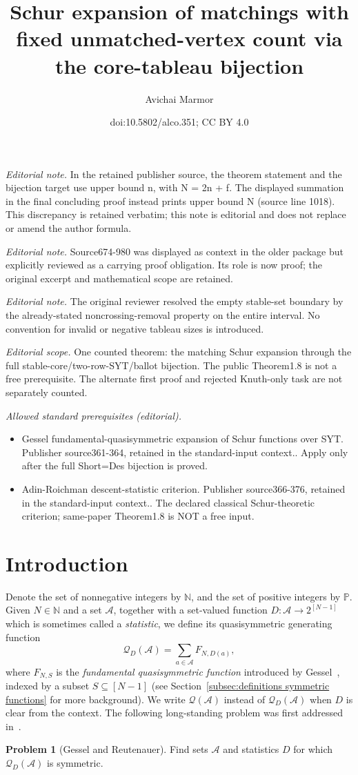 \documentclass[11pt]{article}
\title{Schur expansion of matchings with fixed unmatched-vertex count via the core-tableau bijection}
\author{Avichai Marmor}
\date{doi:10.5802/alco.351; CC BY 4.0}
\theoremstyle{definition}
\numberwithin{equation}{section}
\newtheorem{problem}[theo]{Problem}
\newcommand{\NN}{\mathbb{N}}
\newcommand{\PP}{\mathbb{P}}
\newcommand{\Q}{\mathcal{Q}}
\newcommand{\A}{\mathcal{A}}
\begin{document}
\maketitle
\noindent\textit{Editorial note.} In the retained publisher source, the theorem statement and the bijection target use upper bound n, with N = 2n + f. The displayed summation in the final concluding proof instead prints upper bound N (source line 1018). This discrepancy is retained verbatim; this note is editorial and does not replace or amend the author formula.\par\medskip
\noindent\textit{Editorial note.} Source674-980 was displayed as context in the older package but explicitly reviewed as a carrying proof obligation. Its role is now proof; the original excerpt and mathematical scope are retained.\par\medskip
\noindent\textit{Editorial note.} The original reviewer resolved the empty stable-set boundary by the already-stated noncrossing-removal property on the entire interval. No convention for invalid or negative tableau sizes is introduced.\par\medskip
\noindent\textit{Editorial scope.} One counted theorem: the matching Schur expansion through the full stable-core/two-row-SYT/ballot bijection. The public Theorem1.8 is not a free prerequisite. The alternate first proof and rejected Knuth-only task are not separately counted.\par\medskip
\noindent\textit{Allowed standard prerequisites (editorial).}\begin{itemize}
\item Gessel fundamental-quasisymmetric expansion of Schur functions over SYT. Publisher source361-364, retained in the standard-input context.. Apply only after the full Short=Des bijection is proved.
\item Adin-Roichman descent-statistic criterion. Publisher source366-376, retained in the standard-input context.. The declared classical Schur-theoretic criterion; same-paper Theorem1.8 is NOT a free input.
\end{itemize}\medskip
\section{Introduction}
\label{sec:introduction}

Denote the set of nonnegative integers by $\NN$, and the set of positive integers by $\PP$. Given $N\in \NN$ and a set $\A$, together with a set-valued function $D:\A\to 2^{[N-1]}$ which is sometimes called a \emph{statistic}, we define its quasisymmetric generating function
\[
    \Q_{D} (\A) = \sum_{a \in \A} F_{N, D(a)},
\]
where $F_{N, S}$ is the \emph{fundamental quasisymmetric function} introduced by Gessel~\cite{knuth_classes_schur_positive}, indexed by a subset $S \subseteq [N-1]$ (see Section~\ref{subsec:definitions symmetric functions} for more background). We write $\Q(\A)$ instead of $\Q_{D}(\A)$ when $D$ is clear from the context.
The following long-standing problem was first addressed in~\cite{gessel1993counting}.
\begin{problem}[Gessel and Reutenauer]
    Find sets $\A$ and statistics $D$ for which $\Q_{D}(\A)$ is symmetric.
\end{problem}
\end{document}
